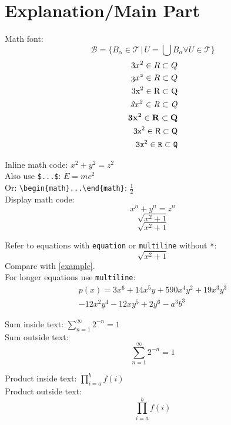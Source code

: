 \pagestyle{plain}
\chapter{Explanation/Main Part}

\noindent Math font:
\[
 \mathcal{B} = \{B_{\alpha} \in \mathcal{T}\, |\,  U = \bigcup B_{\alpha} \forall U \in \mathcal{T} \}
\]
\begin{align*}
    3x^2 \in R \subset Q \\
    \mathnormal{3x^2 \in R \subset Q} \\
    \mathrm{3x^2 \in R \subset Q} \\
    \mathit{3x^2 \in R \subset Q} \\
    \mathbf{3x^2 \in R \subset Q} \\
    \mathsf{3x^2 \in R \subset Q} \\
    \mathtt{3x^2 \in R \subset Q}
\end{align*}

\noindent Inline math code: \(x^2 + y^2 = z^2\) \\
Also use \texttt{\$...\$}: $E=mc^2$ \\
Or: \verb|\begin{math}...\end{math}|: \begin{math}\frac{1}{2}\end{math} \\

\noindent Display math code: \[ x^n + y^n = z^n \] 
\begin{displaymath}
    \sqrt{x^2+1}
\end{displaymath}
\begin{equation*}
    \sqrt{x^2+1}
\end{equation*}

\noindent Refer to equations with \texttt{equation} or \texttt{multiline} without \texttt{*}:
\begin{equation} \label{example}
    \sqrt{x^2+1}
\end{equation}
\noindent Compare with \ref{example}.\\

\noindent For longer equations use \texttt{multiline}:
\begin{multline*}
    p(x) = 3x^6 + 14x^5y + 590x^4y^2 + 19x^3y^3\\ 
    - 12x^2y^4 - 12xy^5 + 2y^6 - a^3b^3
\end{multline*}

\newpage

\noindent Sum inside text: $\sum_{n=1}^{\infty} 2^{-n} = 1$ \\
Sum outside text: \[ \sum_{n=1}^{\infty} 2^{-n} = 1 \]

\noindent Product inside text: $\prod_{i=a}^{b} f(i)$ \\
Product outside text: \[ \prod_{i=a}^{b} f(i) \]

